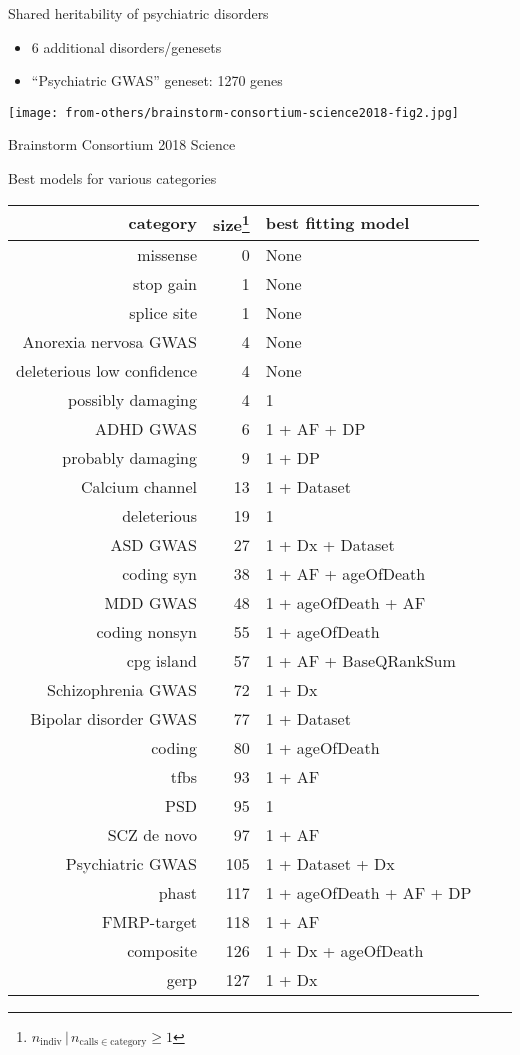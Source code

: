 \documentclass[usenames,dvipsnames]{beamer}
\begin{document}
\begin{frame}{Shared heritability of psychiatric disorders}
\small
\begin{itemize}
\item 6 additional disorders/genesets
\item ``Psychiatric GWAS'' geneset: 1270 genes
\end{itemize}
\texttt{[image: from-others/brainstorm-consortium-science2018-fig2.jpg]}

{\tiny Brainstorm Consortium 2018 Science}
\end{frame}

\begin{frame}{Best models for various categories}
\begin{center}
\tiny
\begin{tabular}{rrl}
\hline
category  & size\footnote{\(n_\mathrm{indiv} \,|\, n_{\mathrm{calls} \in
			\mathrm{category}} \ge 1\)} & best fitting model  \\
\hline
missense & 0 & None \\
stop gain & 1 & None \\
splice site & 1 & None \\
Anorexia nervosa GWAS & 4 & None \\
deleterious low confidence & 4 & None \\
possibly damaging & 4 & 1 \\
ADHD GWAS & 6 & 1 + AF + DP \\
probably damaging & 9 & 1 + DP \\
Calcium channel & 13 & 1 + Dataset \\
deleterious & 19 & 1 \\
ASD GWAS & 27 & 1 + Dx + Dataset \\
coding syn & 38 & 1 + AF + ageOfDeath \\
MDD GWAS & 48 & 1 + ageOfDeath + AF \\
coding nonsyn & 55 & 1 + ageOfDeath \\
cpg island & 57 & 1 + AF + BaseQRankSum \\
Schizophrenia GWAS & 72 & 1 + Dx \\
Bipolar disorder GWAS & 77 & 1 + Dataset \\
coding & 80 & 1 + ageOfDeath \\
tfbs & 93 & 1 + AF \\
PSD & 95 & 1 \\
SCZ de novo & 97 & 1 + AF \\
Psychiatric GWAS & 105 & 1 + Dataset + Dx \\
phast & 117 & 1 + ageOfDeath + AF + DP \\
FMRP-target & 118 & 1 + AF \\
composite & 126 & 1 + Dx + ageOfDeath \\
gerp & 127 & 1 + Dx \\
\end{tabular}
\end{center}
\end{frame}
\end{document}
